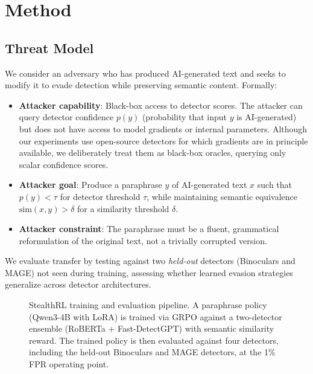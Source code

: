 \documentclass[11pt]{article}
\begin{document}
\section{Method}
\label{sec:method}

\subsection{Threat Model}
\label{sec:threat}

We consider an adversary who has produced AI-generated text and seeks to modify it to evade detection while preserving semantic content. Formally:

\begin{itemize}[leftmargin=*,itemsep=2pt]
  \item \textbf{Attacker capability}: Black-box access to detector scores. The attacker can query detector confidence $p(y)$ (probability that input $y$ is AI-generated) but does not have access to model gradients or internal parameters. Although our experiments use open-source detectors for which gradients are in principle available, we deliberately treat them as black-box oracles, querying only scalar confidence scores.
  \item \textbf{Attacker goal}: Produce a paraphrase $y$ of AI-generated text $x$ such that $p(y) < \tau$ for detector threshold $\tau$, while maintaining semantic equivalence $\text{sim}(x, y) > \delta$ for a similarity threshold $\delta$.
  \item \textbf{Attacker constraint}: The paraphrase must be a fluent, grammatical reformulation of the original text, not a trivially corrupted version.
\end{itemize}

We evaluate transfer by testing against two \emph{held-out} detectors (Binoculars and MAGE) not seen during training, assessing whether learned evasion strategies generalize across detector architectures.

\begin{figure}[t]
\centering
\resizebox{\textwidth}{!}{}
\caption{StealthRL training and evaluation pipeline. A paraphrase policy (Qwen3-4B with LoRA) is trained via GRPO against a two-detector ensemble (RoBERTa + Fast-DetectGPT) with semantic similarity reward. The trained policy is then evaluated against four detectors, including the held-out Binoculars and MAGE detectors, at the 1\% FPR operating point.}
\label{fig:pipeline}
\end{figure}
\end{document}
